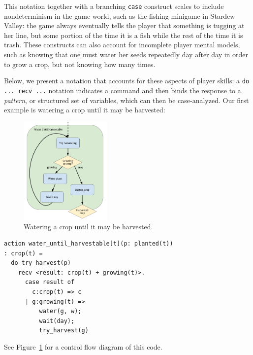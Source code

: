 
This notation together with a branching \verb|case| construct
scales to include nondeterminism in the game world, such as the fishing
minigame in Stardew Valley: the game always eventually tells the player
that something is tugging at her line, but some portion of the time it is a
fish while the rest of the time it is trash.  These constructs can also
account for incomplete player mental models, such as knowing that one must
water her seeds repeatedly day after day in order to grow a crop, but not
knowing how many times.

Below, we present a notation that accounts for these aspects of player
skills: a \verb|do ... recv ...| notation indicates a command and then
binds the response to a {\em pattern}, or structured set of variables,
which can then be case-analyzed.
Our first example is watering a crop until it may be harvested:

\begin{figure}
  \includegraphics[width=0.4\textwidth]{sdv-water-harvest.png}
  \caption{Watering a crop until it may be harvested.}
  \label{fig:harvest}
\end{figure}

\begin{verbatim}
action water_until_harvestable[t](p: planted(t))
: crop(t) =
  do try_harvest(p)
    recv <result: crop(t) + growing(t)>.
      case result of
        c:crop(t) => c
      | g:growing(t) => 
          water(g, w); 
          wait(day); 
          try_harvest(g)
\end{verbatim}
See Figure~\ref{fig:harvest} for a control flow diagram of this code.

